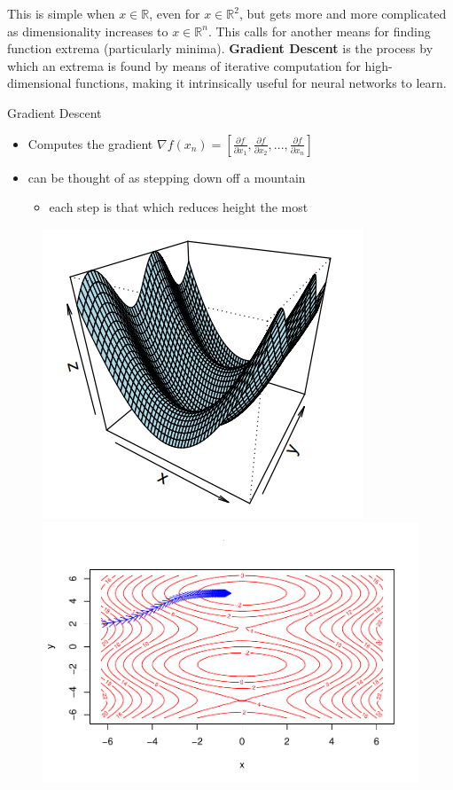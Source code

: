This is simple when \(x \in \mathbb{R}\), even for
\(x \in \mathbb{R}^2\), but gets more  and more complicated as
dimensionality increases to \(x \in \mathbb{R}^n\). This calls for
another means for finding function extrema (particularly minima).
\textbf{Gradient Descent} is the process by which an extrema is found by
means of iterative computation for high-dimensional functions, making it
intrinsically useful for neural networks to learn.

Gradient Descent

\begin{itemize}
\tightlist
\item
  Computes the gradient 
$  
  \nabla f(x_n) =
  \left[ \frac{\partial f}{\partial x_1} , \frac{\partial f}{\partial x_2} , ... , \frac{\partial f}{\partial x_n} \right]
$
  
\item
  can be thought of as stepping down off a mountain

  \begin{itemize}
  \tightlist
  \item
    each step is that which reduces height the most
  \end{itemize}
\end{itemize}



\begin{figure}[H]
    \includegraphics[width = .4\textwidth]{Figures/grad_desc-51.png}
    \includegraphics[width = .6\textwidth]{Figures/grad_desc-50.pdf}
\end{figure}

